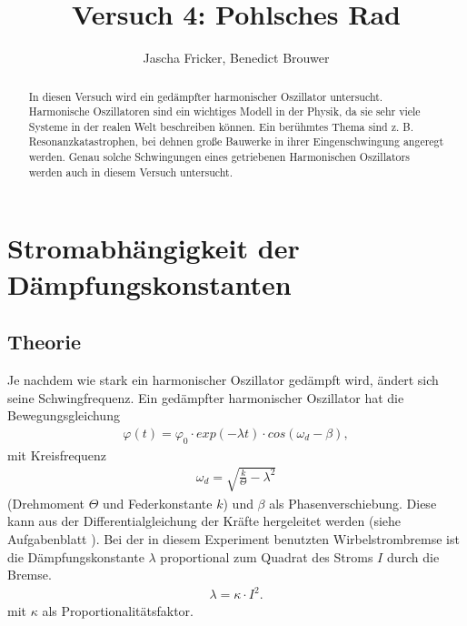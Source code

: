 \documentclass[11pt, a4paper]{article}
\title{Versuch 4: Pohlsches Rad}
\author{Jascha Fricker, Benedict Brouwer}
\begin{document}
    \maketitle

    

    \begin{abstract}
        In diesen Versuch wird ein gedämpfter harmonischer Oszillator untersucht. Harmonische Oszillatoren
        sind ein wichtiges Modell in der Physik, da sie sehr viele Systeme in der realen Welt beschreiben können.
        Ein berühmtes Thema sind z. B. Resonanzkatastrophen, bei dehnen große Bauwerke in ihrer Eingenschwingung
        angeregt werden. Genau solche Schwingungen eines getriebenen Harmonischen Oszillators werden auch in diesem
        Versuch untersucht.
    \end{abstract}

    \tableofcontents

    \newpage

    \section{Stromabhängigkeit der Dämpfungskonstanten}
    \subsection{Theorie}
    Je nachdem wie stark ein harmonischer Oszillator gedämpft wird, ändert sich seine Schwingfrequenz.
    Ein gedämpfter harmonischer Oszillator hat die Bewegungsgleichung
    \begin{align}
        \varphi(t) = \varphi_0 \cdot exp(-\lambda t) \cdot cos(\omega_d - \beta), \label{theo5}
    \end{align}
    mit Kreisfrequenz 
    \begin{align} \label{otheo}
        \omega_d = \sqrt{\frac{k}{\Theta} - \lambda^2}
    \end{align} 
    (Drehmoment $\Theta$ und Federkonstante $k$)
    und $\beta$ als Phasenverschiebung. Diese kann aus der Differentialgleichung der Kräfte 
    hergeleitet werden (siehe Aufgabenblatt \cite[(5)]{POR}).
    Bei der in diesem Experiment benutzten Wirbelstrombremse ist die
    Dämpfungskonstante $\lambda$ proportional zum Quadrat des Stroms $I$ durch die Bremse.
    \begin{align} \label{dtheo}
        \lambda = \kappa \cdot I^2.
    \end{align}
    mit $\kappa$ als Proportionalitätsfaktor.
\end{document}
